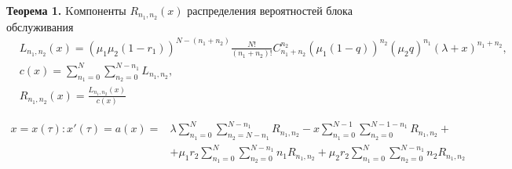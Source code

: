 \textbf{Теорема 1.} Kомпоненты $R_{n_{1}, n_{2}}(x)$ распределения вероятностей блока обслуживания
\begin{equation}
	\begin{split} \label{R}
		&L_{n_{1}, n_{2}}(x) = (\mu_{1}\mu_{2}(1-r_{1}))^{N-(n_{1}+n_{2})}
		\frac{N!}{(n_{1}+n_{2})!}C_{n_{1}+n_{2}}^{n_{2}}
		(\mu_{1}(1-q))^{n_{2}}(\mu_{2}q)^{n_{1}}(\lambda+x)^{n_{1}+n_{2}},\\
		&c(x)=\sum_{n_1=0}^N\sum_{n_2=0}^{N-n_1} L_{n_{1}, n_{2}},\\
		&R_{n_{1}, n_{2}}(x)=\frac{L_{n_{1}, n_{2}}(x)}{c(x)}
	\end{split}
\end{equation}

\begin{equation*}
	\begin{aligned}
		x=x(\tau):x'(\tau)=a(x)=&\lambda \sum_{n_1=0}^N\sum_{n_2=N-n_1}^{N-n_1} 
		R_{n_{1}, n_{2}}
		- x\sum_{n_1=0}^{N-1}\sum_{n_2=0}^{N-1-n_1} 
		R_{n_{1}, n_{2}}+\\
		&+\mu_1 r_2 \sum_{n_1=0}^{N}\sum_{n_2=0}^{N-n_1} 
		n_1 R_{n_{1}, n_{2}}
		+\mu_2 r_2 \sum_{n_1=0}^{N}\sum_{n_2=0}^{N-n_1} 
		n_2 R_{n_{1}, n_{2}}
	\end{aligned}
\end{equation*}